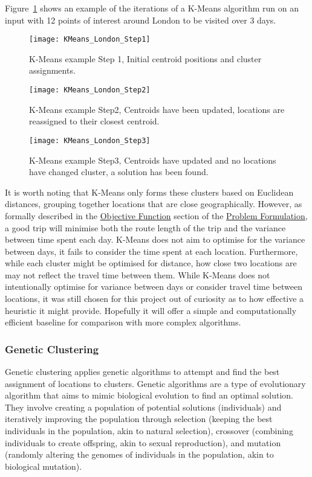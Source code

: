 \noindent
Figure~\ref{fig:KMeans_London_Step1} shows an example of the iterations of a K-Means algorithm run on an input with
12 points of interest around London to be visited over 3 days.
\begin{figure}[H]
    \ContinuedFloat*
    \centering
    \texttt{[image: KMeans\_London\_Step1]}
    \caption{K-Means example Step 1, Initial centroid positions and cluster assignments.}
    \label{fig:KMeans_London_Step1}
\end{figure}
\begin{figure}[H]
    \ContinuedFloat
    \centering
    \texttt{[image: KMeans\_London\_Step2]}
    \caption{K-Means example Step2, Centroids have been updated, locations are reassigned to their closest centroid.}
    \label{fig:KMeans_London_Step2}
\end{figure}
\begin{figure}[H]
    \ContinuedFloat
    \centering
    \texttt{[image: KMeans\_London\_Step3]}
    \caption{K-Means example Step3, Centroids have updated and no locations have changed cluster, a solution has been found.}
    \label{fig:KMeans_London_Step3}
\end{figure}

\noindent
It is worth noting that K-Means only forms these clusters based on Euclidean distances, grouping together locations
that are close geographically.
However, as formally described in the \hyperref[subsec:objective-function]{Objective Function} section of the
\hyperref[sec:problem-formulation]{Problem Formulation}, a good trip will minimise both the route length of the trip
and the variance between time spent each day.
K-Means does not aim to optimise for the variance between days, it fails to consider the time spent at each
location.
Furthermore, while each cluster might be optimised for distance, how close two locations are may not reflect the travel
time between them.
While K-Means does not intentionally optimise for variance between days or consider travel time between locations, it
was still chosen for this project out of curiosity as to how effective a heuristic it might provide.
Hopefully it will offer a simple and computationally efficient baseline for comparison with more complex
algorithms.

\subsubsection{Genetic Clustering}
Genetic clustering applies genetic algorithms to attempt and find the best assignment of locations to clusters.
Genetic algorithms are a type of evolutionary algorithm that aims to mimic biological evolution to find an optimal
solution.
They involve creating a population of potential solutions (individuals) and iteratively improving the population
through selection (keeping the best individuals in the population, akin to natural selection), crossover (combining
individuals to create offspring, akin to sexual reproduction), and mutation (randomly altering the genomes
of individuals in the population, akin to biological mutation).

